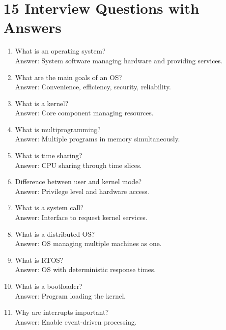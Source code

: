 \section{15 Interview Questions with Answers}

\begin{enumerate}
\item What is an operating system?\\
Answer: System software managing hardware and providing services.

\item What are the main goals of an OS?\\
Answer: Convenience, efficiency, security, reliability.

\item What is a kernel?\\
Answer: Core component managing resources.

\item What is multiprogramming?\\
Answer: Multiple programs in memory simultaneously.

\item What is time sharing?\\
Answer: CPU sharing through time slices.

\item Difference between user and kernel mode?\\
Answer: Privilege level and hardware access.

\item What is a system call?\\
Answer: Interface to request kernel services.

\item What is a distributed OS?\\
Answer: OS managing multiple machines as one.

\item What is RTOS?\\
Answer: OS with deterministic response times.

\item What is a bootloader?\\
Answer: Program loading the kernel.

\item Why are interrupts important?\\
Answer: Enable event-driven processing.


\end{enumerate}
